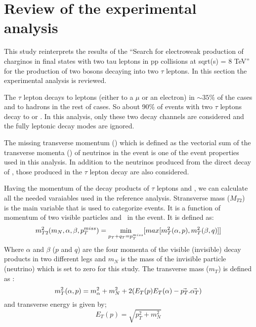 \section{Review of the experimental analysis}


This study reinterprets the results of the ``Search for electroweak production of charginos in final states with two tau leptons in pp collisions at sqrt(s) = 8 TeV''\cite{Khachatryan:2016trj} for the production of two \wprime bosons decaying into two $\tau$ leptons. In this section the experimental analysis is reviewed.

The $\tau$ lepton decays to leptons (either to a $\mu$ or an electron) in $\sim 35\%$ of the cases and to hadrons in the rest of cases. So about 90\% of events with two $\tau$ leptons decay to \lepTau or \tauTau. In this analysis, only these two decay channels are considered and the fully leptonic decay modes are ignored. 

The missing transverse momentum (\MET) which is  defined as the vectorial sum of the transverse momenta (\pt) of neutrinos in the event is one of the event properties used in this analysis. In addition to the neutrinos  produced from the direct decay of \wprime, those produced in the $\tau$ lepton decay are also considered.

Having the momentum of the decay products of $\tau$ leptons and \MET, we can calculate all the needed varaiables used in the reference analysis. Stransverse mass ($M_{T2}$)~\cite{Lester:1999tx,Barr:2003rg}  is the main variable that is used to categorize events. It is a function of momentum of two visible particles and \MET ~in the event. It is defined as:
\begin{equation}
m^2_{T2}(m_{N},\alpha,\beta,p_T^{miss}) = \displaystyle\min_{p_T+q_T=p_T^{miss}} [max[m^2_{T}(\alpha,p),m^2_{T}(\beta,q)]]
\end{equation}
Where $\alpha$ and $\beta$ ($p$ and $q$) are the four momenta of the visible (invisible) decay products in two different legs and  $m_N$ is the mass of the invisible particle (neutrino) which is set to zero for this study. The transverse mass ($m_{T}$) is defined as :
\begin{equation}
m^2_{T}(\alpha,p) =  m^2_{\alpha}+m^2_N+2(E_T(p)E_T(\alpha)-\vec{p_T}.\vec{\alpha_T})
\end{equation}
and transverse energy is given by; 
\begin{equation}
E_T(p)=\sqrt{p^2_T+m^2_N}
\end{equation}

